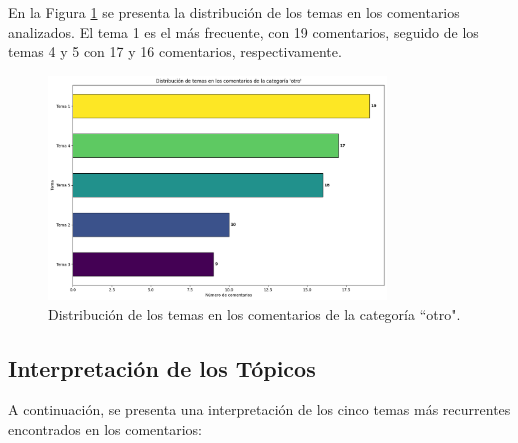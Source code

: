 \documentclass{matematicasud}
\begin{document}
En la Figura \ref{fig:distribucion_temas} se presenta la distribución de los temas en los comentarios analizados. El tema 1 es el más frecuente, con 19 comentarios, seguido de los temas 4 y 5 con 17 y 16 comentarios, respectivamente. 

\begin{figure}[H]
    \centering
    \includegraphics[width=0.8\textwidth]{imaged.png}
    \caption{Distribución de los temas en los comentarios de la categoría ``otro".}
    \label{fig:distribucion_temas}
\end{figure}


\subsection{Interpretación de los Tópicos}

A continuación, se presenta una interpretación de los cinco temas más recurrentes encontrados en los comentarios:
\end{document}
